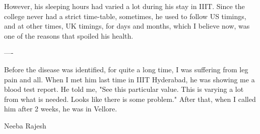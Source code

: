 \begin{english}
However, his sleeping hours had varied a lot during his stay in IIIT. Since the college never had a strict time-table, sometimes, he used to follow US timings, and at other times, UK timings, for days and months, which I believe now, was one of the reasons that spoiled his health.
\begin{center}
---- 
\end{center}
Before the disease was identified, for quite a long time, I was suffering from leg pain and all. When I met him last time in IIIT Hyderabad, he was showing me a blood test report. He told me, "See this particular value. This is varying a lot from what is needed. Looks like there is some problem." After that, when I called him after 2 weeks, he was in Vellore.

Neeba Rajesh
\end{english}
\newpage

